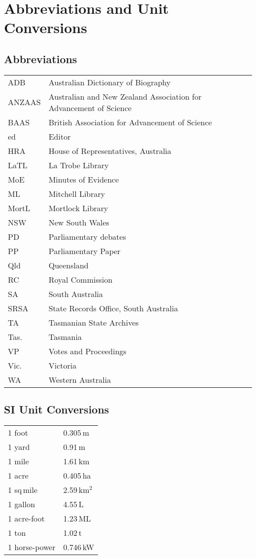 
\chapter{Abbreviations and Unit Conversions}
\label{ch:abbrev}

\section*{Abbreviations} 

\begin{tabular}{ll}
	ADB	& Australian Dictionary of Biography\\
	ANZAAS	& Australian and New Zealand Association for Advancement of
                              Science\\
       	BAAS	& British Association for Advancement of Science\\
	ed	& Editor\\
	HRA	& House of Representatives, Australia\\
	LaTL	& La Trobe Library\\
	MoE	& Minutes of Evidence\\
	ML	& Mitchell Library\\
	MortL	& Mortlock Library\\
	NSW	& New South Wales\\
	PD	& Parliamentary debates\\
	PP	& Parliamentary Paper\\
	Qld	& Queensland\\
	RC	& Royal Commission\\
	SA	& South Australia\\
	SRSA	& State Records Office, South Australia\\
	TA	& Tasmanian State Archives\\
	Tas.	& Tasmania\\
	VP	& Votes and Proceedings\\
	Vic.	& Victoria\\
	WA	& Western Australia\\
\end{tabular}

\section*{SI Unit Conversions}

\begin{tabular}{ll}
	1 foot		& 0.305\,m \\
	1 yard		& 0.91\,m  \\
	1 mile		& 1.61\,km \\
	1 acre		& 0.405\,ha \\
	1 sq\,mile	& 2.59\,km$^2$ \\
	1 gallon	& 4.55\,L \\
	1 acre-foot	& 1.23\,ML \\
	1 ton		& 1.02\,t \\
	1 horse-power	& 0.746\,kW \\
\end{tabular}
